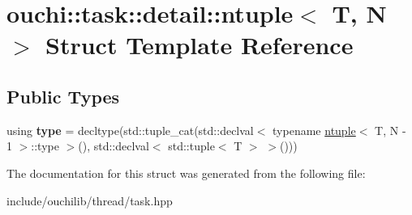 \hypertarget{structouchi_1_1task_1_1detail_1_1ntuple}{}\section{ouchi\+::task\+::detail\+::ntuple$<$ T, N $>$ Struct Template Reference}
\label{structouchi_1_1task_1_1detail_1_1ntuple}
\subsection*{Public Types}
\begin{DoxyCompactItemize}
\item 
\mbox{\label{structouchi_1_1task_1_1detail_1_1ntuple_ab66820845cf313b6541a6ad306907f72}} 
using {\bfseries type} = decltype(std\+::tuple\+\_\+cat(std\+::declval$<$ typename \mbox{\hyperlink{structouchi_1_1task_1_1detail_1_1ntuple}{ntuple}}$<$ T, N -\/ 1 $>$\+::type $>$(), std\+::declval$<$ std\+::tuple$<$ T $>$ $>$()))
\end{DoxyCompactItemize}


The documentation for this struct was generated from the following file\+:\begin{DoxyCompactItemize}
\item 
include/ouchilib/thread/task.\+hpp\end{DoxyCompactItemize}

